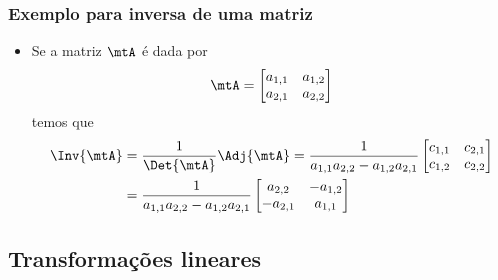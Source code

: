 \begin{frame}
  \frametitle{Exemplo para inversa de uma matriz}
  \begin{itemize}
    \item Se a matriz $\mtA$ é dada por
    \begin{equation*}
      \mtA = \left[\begin{matrix}
          a_{1,1} & a_{1,2} \\
          a_{2,1} & a_{2,2}
      \end{matrix}\right]
    \end{equation*}
    temos que
    \begin{equation*}
      \begin{split}
        \Inv{\mtA} &= \frac{1}{\Det{\mtA}}\Adj{\mtA} = \frac{1}{a_{1,1}a_{2,2} - a_{1,2}a_{2,1}}\left[\begin{matrix}
          c_{1,1} & c_{2,1} \\
          c_{1,2} & c_{2,2}
        \end{matrix}\right] \\
        &= \frac{1}{a_{1,1}a_{2,2} - a_{1,2}a_{2,1}}\left[\begin{matrix}
          a_{2,2} & -a_{1,2} \\
          -a_{2,1} & a_{1,1}
        \end{matrix}\right]
      \end{split}
    \end{equation*}
  \end{itemize}
\end{frame}

\subsection{Transformações lineares}

